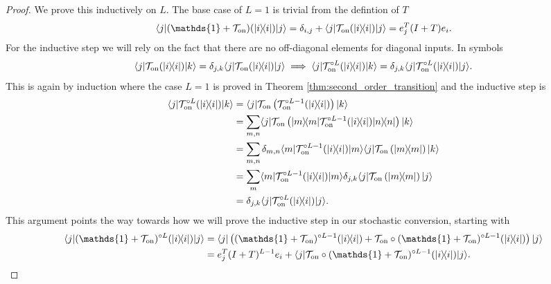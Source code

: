 \documentclass{article}
\newcommand{\on}{\rm on}
\newcommand{\ket}[1]{|#1\rangle}
\newcommand{\bra}[1]{\langle #1|}
\newcommand{\ketbra}[2]{| #1\rangle\! \langle #2|}
\newcommand{\identity}{\mathds{1}}
\begin{document}
\begin{proof}
    We prove this inductively on $L$. The base case of $L = 1$ is trivial from the defintion of $T$
    \begin{align}
    \bra{j} (\identity + \mathcal{T}_{\on})(\ketbra{i}{i}) \ket{j} = \delta_{i,j} + \bra{j} \mathcal{T}_{\on}(\ketbra{i}{i}) \ket{j} = e_j^T (I +  T) e_i.
\end{align}
For the inductive step we will rely on the fact that there are no off-diagonal elements for diagonal inputs. In symbols
\begin{align}
    \bra{j} \mathcal{T}_{\on} (\ketbra{i}{i}) \ket{k} = \delta_{j,k} \bra{j} \mathcal{T}_{\on} (\ketbra{i}{i}) \ket{j} \implies \bra{j} \mathcal{T}_{\on}^{\circ L} (\ketbra{i}{i}) \ket{k} = \delta_{j,k} \bra{j} \mathcal{T}_{\on}^{\circ L} (\ketbra{i}{i}) \ket{j}.
\end{align}
This is again by induction where the case $L = 1$ is proved in Theorem \ref{thm:second_order_transition} and the inductive step is 
\begin{align}
    \bra{j} \mathcal{T}_{\on}^{\circ L} (\ketbra{i}{i}) \ket{k} &= \bra{j} \mathcal{T}_{\on} \left( \mathcal{T}_{\on}^{\circ L - 1} (\ketbra{i}{i}) \right) \ket{k} \\
    &= \sum_{m, n} \bra{j} \mathcal{T}_{\on}\left( \ketbra{m}{m}\mathcal{T}_{\on}^{\circ L - 1}(\ketbra{i}{i}) \ketbra{n}{n}\right) \ket{k} \\
    &= \sum_{m, n} \delta_{m,n} \bra{m}\mathcal{T}_{\on}^{\circ L - 1}(\ketbra{i}{i}) \ket{m} \bra{j} \mathcal{T}_{\on}\left(   \ketbra{m}{m} \right) \ket{k} \\
    &= \sum_{m} \bra{m}\mathcal{T}_{\on}^{\circ L - 1}(\ketbra{i}{i}) \ket{m} \delta_{j,k} \bra{j} \mathcal{T}_{\on}\left(   \ketbra{m}{m} \right) \ket{j} \\
    &= \delta_{j,k} \bra{j} \mathcal{T}_{\on}^{\circ L} (\ketbra{i}{i}) \ket{j}.
\end{align} 
This argument points the way towards how we will prove the inductive step in our stochastic conversion, starting with
\begin{align}
    \bra{j} (\identity + \mathcal{T}_{\on})^{\circ L}(\ketbra{i}{i}) \ket{j} &= \bra{j} \left( (\identity + \mathcal{T}_{\on})^{\circ L - 1} (\ketbra{i}{i}) + \mathcal{T}_{\on} \circ (\identity + \mathcal{T}_{\on})^{\circ L - 1} (\ketbra{i}{i}) \right)\ket{j} \\
    &= e_j^T (I + T)^{L - 1} e_i + \bra{j} \mathcal{T}_{\on} \circ (\identity + \mathcal{T}_{\on})^{\circ L - 1} (\ketbra{i}{i}) \ket{j} . \label{eq:matrix_reloaded1}

\end{align}
\end{proof}
\end{document}
